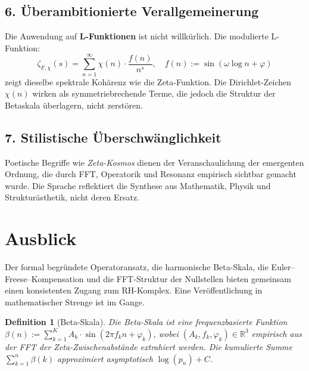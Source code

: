 \documentclass[12pt]{article}
\newtheorem{definition}{Definition}
\begin{document}
\subsection*{6. Überambitionierte Verallgemeinerung}

Die Anwendung auf \textbf{L-Funktionen} ist nicht willkürlich. Die modulierte L-Funktion:
\[
\zeta_{F,\chi}(s) = \sum_{n=1}^\infty \chi(n) \cdot \frac{f(n)}{n^s}, \quad f(n) := \sin(\omega \log n + \varphi)
\]
zeigt dieselbe spektrale Kohärenz wie die Zeta-Funktion. Die Dirichlet-Zeichen $\chi(n)$ wirken als symmetriebrechende Terme, die jedoch die Struktur der Betaskala überlagern, nicht zerstören.

\subsection*{7. Stilistische Überschwänglichkeit}

Poetische Begriffe wie \textit{Zeta-Kosmos} dienen der Veranschaulichung der emergenten Ordnung, die durch FFT, Operatorik und Resonanz empirisch sichtbar gemacht wurde. Die Sprache reflektiert die Synthese aus Mathematik, Physik und Strukturästhetik, nicht deren Ersatz.

\section{Ausblick}

Der formal begründete Operatoransatz, die harmonische Beta-Skala, die Euler--Freese--Kompensation und die FFT-Struktur der Nullstellen bieten gemeinsam einen konsistenten Zugang zum RH-Komplex. Eine Veröffentlichung in mathematischer Strenge ist im Gange.

\begin{definition}[Beta-Skala]
Die Beta-Skala ist eine frequenzbasierte Funktion \( \beta(n) := \sum_{k=1}^K A_k \cdot \sin(2\pi f_k n + \varphi_k) \), wobei \( (A_k, f_k, \varphi_k) \in \mathbb{R}^3 \) empirisch aus der FFT der Zeta-Zwischenabstände extrahiert werden. Die kumulierte Summe \( \sum_{k=1}^n \beta(k) \) approximiert asymptotisch \( \log(p_n) + C \).
\end{definition}
\end{document}
